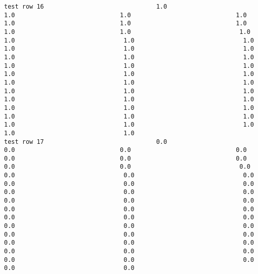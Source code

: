 \documentclass[11pt]{article}
\begin{document}
\begin{verbatim}
test row 16                               1.0                             1.0                             1.0                             1.0                             1.0                             1.0                             1.0                             1.0                             1.0                              1.0                              1.0                              1.0                              1.0                              1.0                              1.0                              1.0                              1.0                              1.0                              1.0                              1.0                              1.0                              1.0                              1.0                              1.0                              1.0                              1.0                              1.0                              1.0                              1.0                              1.0                              1.0                              1.0                              1.0                              1.0                              1.0                              1.0                              1.0                              1.0                              1.0                              1.0                              1.0                              1.0                              1.0                              1.0                              1.0
test row 17                               0.0                             0.0                             0.0                             0.0                             0.0                             0.0                             0.0                             0.0                             0.0                              0.0                              0.0                              0.0                              0.0                              0.0                              0.0                              0.0                              0.0                              0.0                              0.0                              0.0                              0.0                              0.0                              0.0                              0.0                              0.0                              0.0                              0.0                              0.0                              0.0                              0.0                              0.0                              0.0                              0.0                              0.0                              0.0                              0.0                              0.0                              0.0                              0.0                              0.0                              0.0                              0.0                              0.0                              0.0                              0.0

\end{verbatim}
\end{document}
